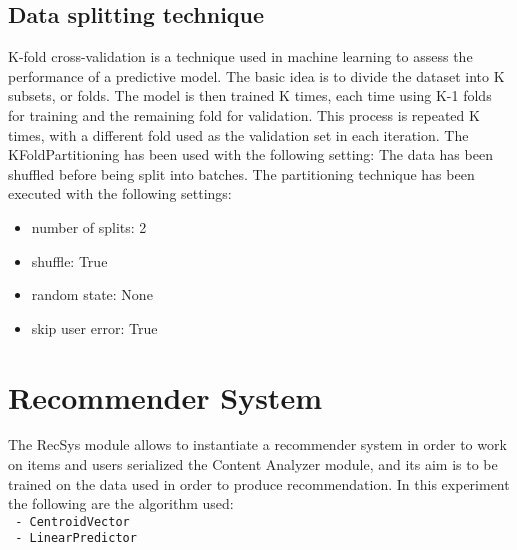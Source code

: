\documentclass[11pt]{article}
\begin{document}
\hfill\break



\subsection{Data splitting technique}\label{subsec:partitioning}
K-fold cross-validation is a technique used in machine learning to assess the performance of a predictive model.
The basic idea is to divide the dataset into K subsets, or folds.
The model is then trained K times, each time using K-1 folds for training and the remaining fold for validation.
This process is repeated K times, with a different fold used as the validation set in each iteration.
\hfill\break
The KFoldPartitioning has been used with the following setting:
\hfill\break
The data has been shuffled before being split into batches.
The partitioning technique has been executed with the following settings:
\begin{itemize}
    \item number of splits: 2
    \item shuffle: True
    \item random state: None
    \item skip user error: True
\end{itemize}
\hfill\break



\section{Recommender System}\label{sec:recsys}
The RecSys module allows to instantiate a recommender system in order to work on items and users serialized
the Content Analyzer module, and its aim is to be trained on the data used in order to produce recommendation.
In this experiment the following are the algorithm used: \\


    \lstinline[style=verbatim-text]| - CentroidVector |  \\


    \lstinline[style=verbatim-text]| - LinearPredictor |  \\
\end{document}
